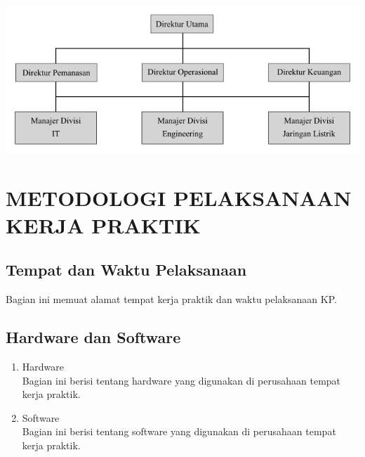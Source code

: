 \documentclass[oneside,listof=totoc]{scrbook}
\begin{document}
\begin{center}
  \begin{minipage}{\textwidth}
    \label{gambar:2.1}
    \includegraphics[width=14.5cm]{gambar/gambar_2_1.png}
    \vspace{-0.5cm}
  \end{minipage}
\end{center}

\chapter{METODOLOGI PELAKSANAAN KERJA PRAKTIK}

\vspace{0.5cm}

\section{Tempat dan Waktu Pelaksanaan}
Bagian ini memuat alamat tempat kerja praktik dan waktu pelaksanaan KP.

\section{Hardware dan Software}
\begin{enumerate}[label=\alph*.]
  \item Hardware\\
  Bagian ini berisi tentang hardware yang digunakan di perusahaan tempat kerja praktik.
  \item Software\\
  Bagian ini berisi tentang software yang digunakan di perusahaan tempat kerja praktik.
\end{enumerate}
\end{document}
